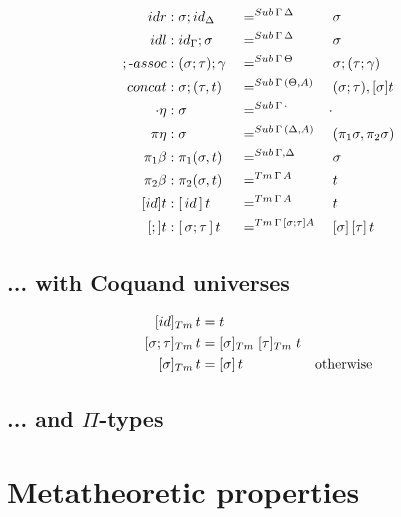 \documentclass[a4paper,UKenglish,numberwithinsect,cleveref,thm-restate]{lipics-v2021}
\begin{document}
\begin{alignat*}{3}
  \mathsf{idr}    & : {\sigma ; \idS_{\Delta}} && =^{\Sub\,\Gamma\,\Delta} && {\sigma} \\
  \mathsf{idl}    & : {\idS_{\Gamma} ; \sigma} && =^{\Sub\,\Gamma\,\Delta} && {\sigma} \\
  ;\text{-}\mathsf{assoc} & : (\sigma ; \tau) ; \gamma && =^{\Sub\,\Gamma\,\Theta} &&  \sigma ; (\tau ; \gamma) \\
  \mathsf{concat} & : \sigma ; (\tau , t)      && =^{\Sub\,\Gamma\,(\Theta, A)} &&  (\sigma ; \tau) , [ \sigma ] t \\
  \emptyctx\eta   & : \sigma                   && =^{\Sub\,\Gamma\,\emptyctx} & \emptysub \\
  \pi\eta         & : \sigma                   && =^{\Sub\,\Gamma\,(\Delta, A)} &&  (\pi_1 \sigma, \pi_2 \sigma) \\
  \pi_1\beta      & : \pi_1(\sigma , t)        && =^{\Sub\,\Gamma,\Delta} &&  \sigma \\
  \pi_2\beta      & : \pi_2(\sigma , t)        && =^{\Tm\,\Gamma\, A} &&  t \\
  [\idS]t         & : {[\,\idS\,]\,t}          && =^{\Tm\,\Gamma\,A} && t \\
  [;]t            & : {[\,\sigma ; \tau\,]\,t} && =^{\Tm\,\Gamma\,[\sigma ; \tau] A} && {[ \sigma ]\,[ \tau ]\,t} \\
\end{alignat*}

\subsection{... with Coquand universes} \label{subsec:SC+U}
\cite{Coquand2013}
\begin{alignat*}{3}
[ \idS ]_{\Tm}\,t          & = t \\
[ \sigma ; \tau ]_{\Tm}\,t & = [ \sigma ]_{\Tm}\;[ \tau ]_{\Tm}\;t \\
[ \sigma ]_{\Tm}\,t        & = [ \sigma ]\,t & \text{otherwise}  \\
\end{alignat*}
\subsection{... and \texorpdfstring{$\Pi$}{Π}-types} \label{subsec:SC+U+Pi}

\section{Metatheoretic properties}
\end{document}
